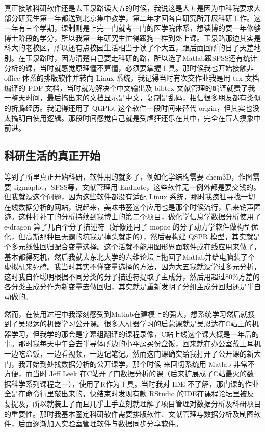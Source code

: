 \documentclass[
]{book}
\begin{document}
真正接触科研软件还是去玉泉路读大五的时候，我说这是大五是因为中科院要求大部分研究生第一年都送到北京集中教学，第二年才回各自研究所开展科研工作。这一年有三个学期，课制则是上完一门就考一门的医学院体系，想读博的要一年修够博士阶段的学分，所以我第一年研究生忙得跟狗一样到处上课。玉泉路那边其实是科大的老校区，所以还有点校园生活相当于读了个大五，跟后面回所的日子天差地别。在玉泉路时，因为清楚自己要走科研的路，所以选了Matlab跟SPSS还有统计分析的课，当时就感觉原理懂不算懂，必须要掌握工具。那时候我也开始接触非 office 体系的排版软件并转向 Linux 系统，我记得当时有次交作业我是用 tex 文档编译的 PDF 文档，当时就为解决个中文输出及 bibtex 文献管理的编译就费了我一整天时间，最后搞出来的文档显示是中文，复制是乱码，相信很多朋友都有类似的折腾经历。我记得还用了 QtiPlot 这个软件一段时间来替代 origin，但其实也没太搞明白使用逻辑。那段时间感觉自己就是受虐狂还乐在其中，完全在盲人摸象中前进。

\hypertarget{ux79d1ux7814ux751fux6d3bux7684ux771fux6b63ux5f00ux59cb}{%
\subsection{科研生活的真正开始}\label{ux79d1ux7814ux751fux6d3bux7684ux771fux6b63ux5f00ux59cb}}

等到了所里真正开始科研，软件用的就多了，例如化学结构需要 chem3D，作图需要 sigmaplot，SPSS等，文献管理用 Endnote，这些软件无一例外都是要交钱的。但我就没这个问题，因为这些软件都没有适配 Linux 系统，那时我疯狂寻找一切在线数据分析的网站，说起来，美味书签这个应用也是那个时候流行，后来销声匿迹。这种打补丁的分析持续到我博士的第二个项目，做化学信息学数据分析使用了 e-dragon 算了几百个分子描述符（好像还用了 mopac 的分子动力学软件做构型优化，但高斯那种巨无霸的坑我是掉头就走的），然后要构建 QSPR 模型，其实就是个多元线性回归配合变量选择。这个活就不能用图形界面软件或在线应用来做了，基本都得死机，然后我就去东北大学的六维论坛上拖回了Matlab并给电脑装了个虚拟机来死磕。我当时其实不懂变量选择的方法，因为大五我就没学过多元分析，这时我自作聪明根据不同分类的分子描述符提取了主成分，然后用超过80\%方差的各分类主成分作为新变量去做回归，其实就是重新发明了分组主成分回归还是半自动做的。

然而，在使用过程中我深刻感受到Matlab在建模上的强大，想系统学习然后就搜到了吴恩达的机器学习公开课。很多人机器学习的启蒙课就是吴恩达在C站上的机器学习，但我学的那会是字幕组翻译的课程录像，C站上线这个课大概是一年后的事。那时我每天中午会去半导体所边的小平房买份盒饭，回来就在办公室戴上耳机一边吃盒饭，一边看视频，一边记笔记。然而这门课确实给我打开了公开课的新大门，我开始到处找数据分析的公开课学，那个时候 来回切系统用 Matlab 非常不方便，而当时 Jeff Leek 在C站开了门数据分析的课（后来扩展成了C站最火的数据科学系列课程之一），使用了R作为工具。当时我对 IDE 不了解，那门课的作业全是在命令行里敲出来的，快结束时发现有款 RStudio 的IDE在课程论坛里被反复提及，所以就装上了而且几乎上手立刻就理解了项目管理对数据分析及科研项目的重要性。那时我基本圈定科研软件需要排版软件、文献管理与数据分析及制图软件，后面逐渐加入实验室管理软件与数据同步分享软件。
\end{document}
